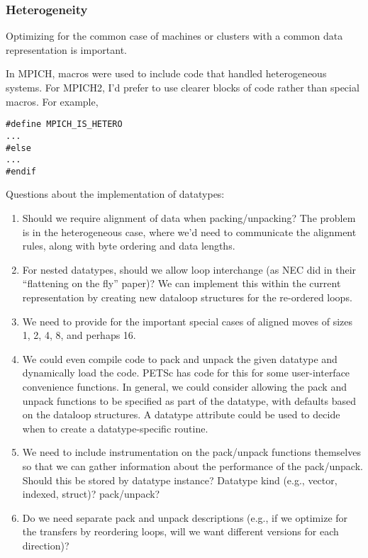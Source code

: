 \documentclass{article}
\begin{document}
\subsubsection{Heterogeneity}
\label{sec:hetero}
Optimizing for the common case of machines or clusters with a common
data representation is important.  

In MPICH, macros were used to include code that handled heterogeneous
systems.  For MPICH2, I'd prefer to use clearer blocks of code rather
than special macros.  For example,
\begin{verbatim}
#define MPICH_IS_HETERO
...
#else
...
#endif
\end{verbatim}

Questions about the implementation of datatypes:

\begin{enumerate}
\item Should we require alignment of data when packing/unpacking?  The
   problem is in the heterogeneous case, where we'd need to communicate
   the alignment rules, along with byte ordering and data lengths.

\item For nested datatypes, should we allow loop interchange (as NEC did
   in their ``flattening on the fly'' paper)?  We can implement this
   within the current representation by creating new dataloop
   structures for the re-ordered loops.  

\item We need to provide for the important special cases of aligned moves
   of sizes 1, 2, 4, 8, and perhaps 16.

\item We could even compile code to pack and unpack the given datatype
   and dynamically load the code.  PETSc has code for this for some
   user-interface convenience functions.  In general, we could
   consider allowing the pack and unpack functions to be specified as
   part of the datatype, with defaults based on the dataloop
   structures.  A datatype attribute could be used to decide when to
   create a datatype-specific routine.

\item We need to include instrumentation on the pack/unpack functions
   themselves so that we can gather information about the performance
   of the pack/unpack.  Should this be stored by datatype instance?
   Datatype kind (e.g., vector, indexed, struct)?  pack/unpack?

\item Do we need separate pack and unpack descriptions (e.g., if we
   optimize for the transfers by reordering loops, will we want
   different versions for each direction)?


\end{enumerate}
\end{document}
